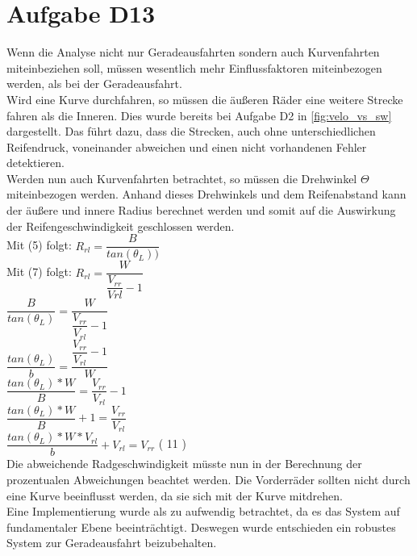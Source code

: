 \chapter{Aufgabe D13}

Wenn die Analyse nicht nur Geradeausfahrten sondern auch Kurvenfahrten miteinbeziehen soll, müssen wesentlich mehr Einflussfaktoren miteinbezogen werden, als bei der Geradeausfahrt.\\
Wird eine Kurve durchfahren, so müssen die äußeren Räder eine weitere Strecke fahren als die Inneren. Dies wurde bereits bei Aufgabe D2 in \autoref{fig:velo_vs_sw} dargestellt. Das führt dazu, dass die Strecken, auch ohne unterschiedlichen Reifendruck, voneinander abweichen und einen nicht vorhandenen Fehler detektieren.\\
Werden nun auch Kurvenfahrten betrachtet, so müssen die Drehwinkel $\Theta$ miteinbezogen werden. Anhand dieses Drehwinkels und dem Reifenabstand kann der äußere und innere Radius berechnet werden und somit auf die Auswirkung der Reifengeschwindigkeit geschlossen werden. \\

Mit (5) folgt: $R_{rl} = \dfrac{B}{tan(\theta_{L}))}$\\

Mit (7) folgt: $R_{rl} =  \dfrac{W}{\dfrac{V_{rr}}{V{rl}} -1}$\\

\hspace*{2.5cm} $\dfrac{B}{tan(\theta_{L})} = \dfrac{W}{\dfrac{V_{rr}}{V_{rl}}-1}$\\

\hspace*{2.5cm} $\dfrac{tan(\theta_{L})}{b} = \dfrac{\dfrac{V_{rr}}{V_{rl}} -1}{W}$\\

\hspace*{2.5cm} $\dfrac{tan(\theta_{L})*W}{B} = \dfrac{V_{rr}}{V_{rl}}-1$\\

\hspace*{2.5cm} $\dfrac{ tan(\theta_{L})*W}{B}+1 = \dfrac{V_{rr}}{V_{rl}}$\\

\hspace*{2.5cm} $\dfrac{ tan(\theta_{L})*W*V_{rl}}{b}+V_{rl} = V_{rr}$  ( 11 )\\
 Die abweichende Radgeschwindigkeit müsste nun in der Berechnung der prozentualen Abweichungen beachtet werden.
 Die Vorderräder sollten nicht durch eine Kurve beeinflusst werden, da sie sich mit der Kurve mitdrehen.\\
 Eine Implementierung wurde als zu aufwendig betrachtet, da es das System auf fundamentaler Ebene beeinträchtigt. Deswegen wurde entschieden ein robustes System zur Geradeausfahrt beizubehalten.
 
